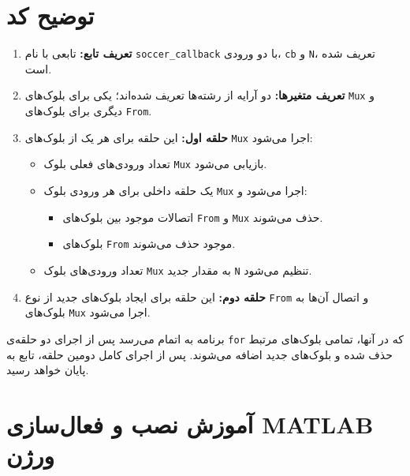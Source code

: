 \section*{توضیح کد}

\begin{enumerate}
	\item \textbf{تعریف تابع:} تابعی با نام \texttt{soccer\_callback} با دو ورودی، \texttt{cb} و \texttt{N}، تعریف شده است.
	\item \textbf{تعریف متغیر‌ها:} دو آرایه از رشته‌ها تعریف شده‌اند؛ یکی برای بلوک‌های \texttt{Mux} و دیگری برای بلوک‌های \texttt{From}.
	\item \textbf{حلقه اول:} این حلقه برای هر یک از بلوک‌های \texttt{Mux} اجرا می‌شود:
	\begin{itemize}
		\item تعداد ورودی‌های فعلی بلوک \texttt{Mux} بازیابی می‌شود.
		\item یک حلقه داخلی برای هر ورودی بلوک \texttt{Mux} اجرا می‌شود و:
		\begin{itemize}
			\item اتصالات موجود بین بلوک‌های \texttt{From} و \texttt{Mux} حذف می‌شوند.
			\item بلوک‌های \texttt{From} موجود حذف می‌شوند.
		\end{itemize}
		\item تعداد ورودی‌های بلوک \texttt{Mux} به مقدار جدید \texttt{N} تنظیم می‌شود.
	\end{itemize}
	\item \textbf{حلقه دوم:} این حلقه برای ایجاد بلوک‌های جدید از نوع \texttt{From} و اتصال آن‌ها به بلوک‌های \texttt{Mux} اجرا می‌شود.
\end{enumerate}

برنامه به اتمام می‌رسد پس از اجرای دو حلقه‌ی \texttt{for} که در آنها، تمامی بلوک‌های مرتبط حذف شده و بلوک‌های جدید اضافه می‌شوند. پس از اجرای کامل دومین حلقه، تابع به پایان خواهد رسید.


\newpage

\section*{آموزش نصب و فعال‌سازی MATLAB ورژن }

